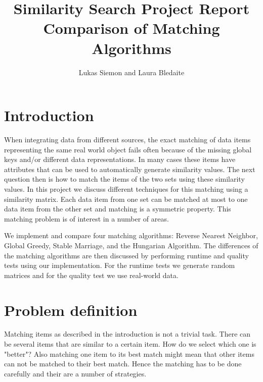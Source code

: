 \documentclass[a4paper,11pt]{article}
\newcommand\etc{\textsl{etc}}
\begin{document}
\title{
  \textbf{\large Similarity Search Project Report}\\
  Comparison of Matching Algorithms
}

\author{Lukas Siemon and Laura Bledaite}
\maketitle


\section{Introduction}

When integrating data from different sources, the exact matching of data items representing the same real world object fails often because of the missing global keys and/or different data representations. In many cases these items have attributes that can be used to automatically generate similarity values. The next question then is how to match the items of the two sets using these similarity values. In this project we discuss different techniques for this matching using a similarity matrix. Each data item from one set can be matched at most to one data item from the other set and matching is a symmetric property. This matching problem is of interest in a number of areas.

We implement and compare four matching algorithms: Reverse Nearest Neighbor, Global Greedy, Stable Marriage, and the Hungarian Algorithm. 
The differences of the matching algorithms are then discussed by performing runtime and quality tests using our implementation. For the runtime tests we generate random matrices and for the quality test we use real-world data.

 

\section{Problem definition}
Matching items as described in the introduction is not a trivial task. There can be several items that are similar to a certain item. How do we select which one is "better"? Also matching one item to its best match might mean that other items can not be matched to their best match. Hence the matching has to be done carefully and their are a number of strategies.
\end{document}
